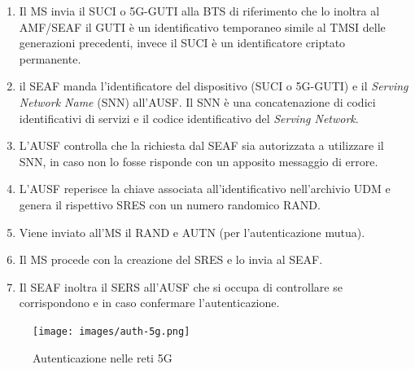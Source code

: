 \begin{enumerate}
    \item Il MS invia il SUCI o 5G-GUTI alla BTS di riferimento che lo inoltra al AMF/SEAF
    il GUTI è un identificativo temporaneo simile al TMSI delle generazioni precedenti, invece il SUCI è un identificatore criptato
    permanente.
    \item il SEAF manda l'identificatore del dispositivo (SUCI o 5G-GUTI) e il \textit{Serving Network Name} (SNN) all'AUSF.
    Il SNN è una concatenazione di codici identificativi di servizi e il codice identificativo del \textit{Serving Network}.
    \item L'AUSF controlla che la richiesta dal SEAF sia autorizzata a utilizzare il SNN, in caso non lo fosse risponde con un 
    apposito messaggio di errore.
    \item L'AUSF reperisce la chiave associata all'identificativo nell'archivio UDM e genera il rispettivo SRES con un numero randomico RAND.
    \item Viene inviato all'MS il RAND e AUTN (per l'autenticazione mutua).
    \item Il MS procede con la creazione del SRES e lo invia al SEAF.
    \item Il SEAF inoltra il SERS all'AUSF che si occupa di controllare se corrispondono e in caso confermare l'autenticazione.
\end{enumerate}
\begin{figure}[h]
    \centering
    \texttt{[image: images/auth-5g.png]}
    \caption{Autenticazione nelle reti 5G}
\end{figure}